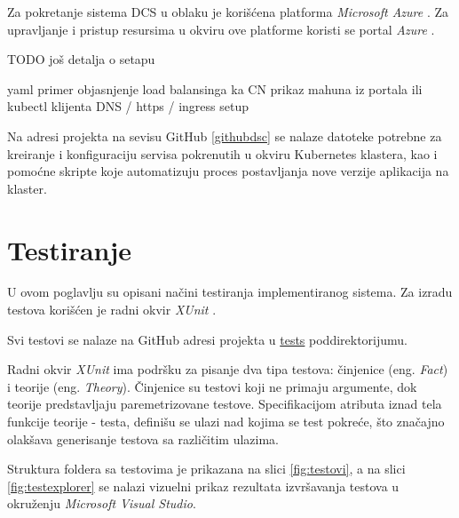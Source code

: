 \documentclass[12pt,oneside]{memoir}
\begin{document}
Za pokretanje sistema DCS u oblaku je korišćena platforma \emph{Microsoft Azure} \cite{Azure}. Za upravljanje i pristup resursima u okviru ove platforme koristi se portal \emph{Azure} \cite{AzurePortal}.

TODO još detalja o setapu

yaml primer
objasnjenje load balansinga ka CN
prikaz mahuna iz portala ili kubectl klijenta
DNS / https / ingress setup


Na adresi projekta na sevisu GitHub \ref{githubdsc} se nalaze datoteke potrebne za kreiranje i konfiguraciju servisa pokrenutih u okviru Kubernetes klastera, kao i pomoćne skripte koje automatizuju proces postavljanja nove verzije aplikacija na klaster.


\section{Testiranje}
\label{chp:testiranjesistema}

U ovom poglavlju su opisani načini testiranja implementiranog sistema. Za izradu testova korišćen je radni okvir \emph{XUnit} \cite{XUnit}.

Svi testovi se nalaze na GitHub adresi projekta u \href{https://github.com/milana-kovacevic/DistributedComputationSystem/tree/main/tests}{tests} poddirektorijumu.

Radni okvir \emph{XUnit} ima podršku za pisanje dva tipa testova: činjenice (eng. \emph{Fact}) i teorije (eng. \emph{Theory}). Činjenice su testovi koji ne primaju argumente, dok teorije predstavljaju paremetrizovane testove. Specifikacijom atributa iznad tela funkcije teorije - testa, definišu se ulazi nad kojima se test pokreće, što značajno olakšava generisanje testova sa različitim ulazima.

Struktura foldera sa testovima je prikazana na slici \ref{fig:testovi}, a na slici \ref{fig:testexplorer} se nalazi vizuelni prikaz rezultata izvršavanja testova u okruženju \emph{Microsoft Visual Studio}.
\end{document}

